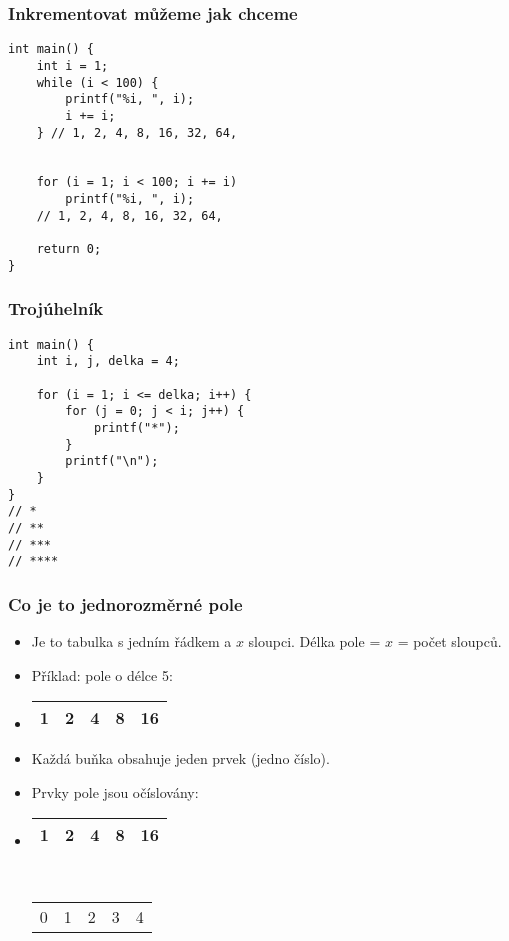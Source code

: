 \documentclass{beamer}
\newenvironment{itemizex}%
  {\large \begin{itemize}%
    \setlength{\itemsep}{8pt}%
    \setlength{\parskip}{8pt}}%
  {\end{itemize}}
\begin{document}
\begin{frame}[t,fragile]\frametitle{Inkrementovat můžeme jak chceme} 
\begin{verbatim} 
int main() {
    int i = 1;
    while (i < 100) {
        printf("%i, ", i);
        i += i;
    } // 1, 2, 4, 8, 16, 32, 64, 


    for (i = 1; i < 100; i += i)
        printf("%i, ", i);
    // 1, 2, 4, 8, 16, 32, 64, 

    return 0;
}
\end{verbatim}
\end{frame}


\begin{frame}[t,fragile]\frametitle{Trojúhelník} 
\begin{verbatim} 
int main() {
    int i, j, delka = 4;

    for (i = 1; i <= delka; i++) {
        for (j = 0; j < i; j++) {
            printf("*");
        }
        printf("\n");
    }
}
// *
// **
// ***
// ****
\end{verbatim}
\end{frame}


\begin{frame}[t,fragile]\frametitle{Co je to jednorozměrné pole}
\begin{itemizex}
    \item Je to tabulka s jedním řádkem a $x$ sloupci. Délka pole = $x$ = počet sloupců.
    \item Příklad: pole o délce 5:
    \item 
\begin{tabular}{|c|c|c|c|c|}
\hline 1& 2 & 4 & 8 &16 \\\hline
\end{tabular}
    \item Každá buňka obsahuje jeden prvek (jedno číslo).
    \item Prvky pole jsou očíslovány:
    \item 
\begin{tabular}{|c|c|c|c|c|}
\hline 1& 2 & 4 & 8 &16 \\\hline
\end{tabular}\\
\begin{tabular}{ccccc}
 0&1&2&3&4
\end{tabular}
\end{itemizex}

\end{frame}
\end{document}
